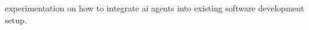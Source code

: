 experimentation on how to integrate ai agents into existing software development setup.

    
\divider


